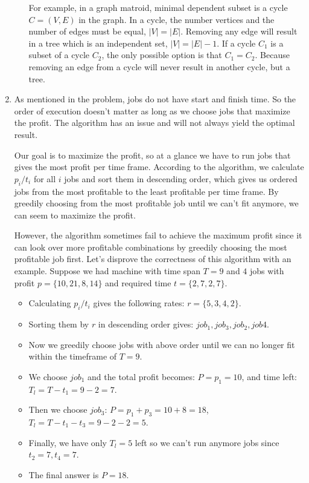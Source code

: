 \documentclass{article}
\begin{document}
\begin{enumerate}
\begin{enumerate}
      For example, in a graph matroid, minimal dependent subset is a cycle $C=(V,E)$ in the graph.
      In a cycle, the number vertices and the number of edges must be equal, $|V|=|E|$.
      Removing any edge will result in a tree which is an independent set, $|V|=|E|-1$.
      If a cycle $C_1$ is a subset of a cycle $C_2$, the only possible option is that $C_1=C_2$.
      Because removing an edge from a cycle will never result in another cycle, but a tree.
    \end{enumerate}
  \item As mentioned in the problem, jobs do not have start and finish time.
  So the order of execution doesn't matter as long as we choose jobs that maximize the profit.
  The algorithm has an issue and will not always yield the optimal result.

  Our goal is to maximize the profit, so at a glance we have to run jobs that gives the most profit per time frame.
  According to the algorithm, we calculate $p_i/t_i$ for all $i$ jobs and sort them in descending order, which gives us ordered jobs from the most profitable to the least profitable per time frame.
  By greedily choosing from the most profitable job until we can't fit anymore, we can seem to maximize the profit.

  However, the algorithm sometimes fail to achieve the maximum profit since it can look over more profitable combinations by greedily choosing the most profitable job first.
  Let's disprove the correctness of this algorithm with an example.
  Suppose we had machine with time span $T=9$ and $4$ jobs with profit $p=\{10, 21, 8, 14\}$ and required time $t=\{2,7,2,7\}$.

  \begin{itemize}
    \item Calculating $p_i/t_i$ gives the following rates: $r=\{5,3,4,2\}$.
    \item Sorting them by $r$ in descending order gives: $job_1,job_3,job_2,job4$.
    \item Now we greedily choose jobs with above order until we can no longer fit within the timeframe of $T=9$.
    \item We choose $job_1$ and the total profit becomes: $P=p_1=10$, and time left: $T_l=T-t_1=9-2=7$.
    \item Then we choose $job_3$: $P=p_1+p_3=10+8=18$, $T_l=T-t_1-t_3=9-2-2=5$.
    \item Finally, we have only $T_l=5$ left so we can't run anymore jobs since $t_2=7,t_4=7$.
    \item The final answer is $P=18$.
  \end{itemize}


\end{enumerate}
\end{document}
